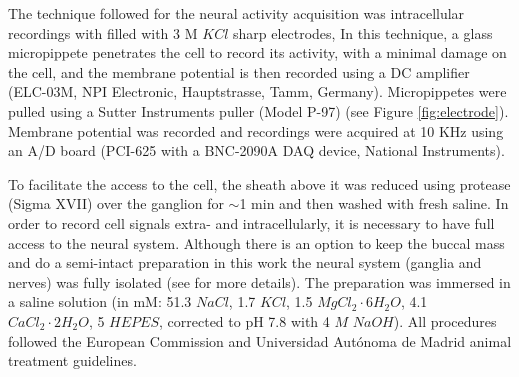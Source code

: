 The technique followed for the neural activity acquisition was intracellular recordings with filled with 3 M $KCl$ sharp electrodes, %
 In this technique, a glass micropippete penetrates the cell to record its activity, with a minimal damage on the cell, and the membrane potential is then recorded using a DC amplifier (ELC-03M, NPI Electronic, Hauptstrasse, Tamm, Germany). Micropippetes were pulled using a Sutter Instruments puller (Model P-97) (see Figure \ref{fig:electrode}). Membrane potential was recorded and recordings were acquired at 10 KHz using an A/D board (PCI-625 with a BNC-2090A DAQ device, National Instruments).

To facilitate the access to the cell, the sheath above it was reduced using protease (Sigma XVII) over the ganglion for $\sim$1 min and then washed with fresh saline. In order to record cell signals extra- and intracellularly, it is necessary to have full access to the neural system. Although there is an option to keep the buccal mass and do a semi-intact preparation \parencite{staras_cellular_1999} in this work the neural system (ganglia and nerves) was fully isolated (see \cite{garrido-pena_tfm_2022} for more details). The preparation was immersed in a saline solution (in mM: 51.3 $NaCl$, 1.7 $KCl$, 1.5 $MgCl_2\cdot6H_2O$, 4.1 $CaCl_2\cdot2H_2O$, 5 $HEPES$, corrected to pH 7.8 with 4 $M$ $NaOH$). All procedures followed the European Commission and Universidad Autónoma de Madrid animal treatment guidelines.


